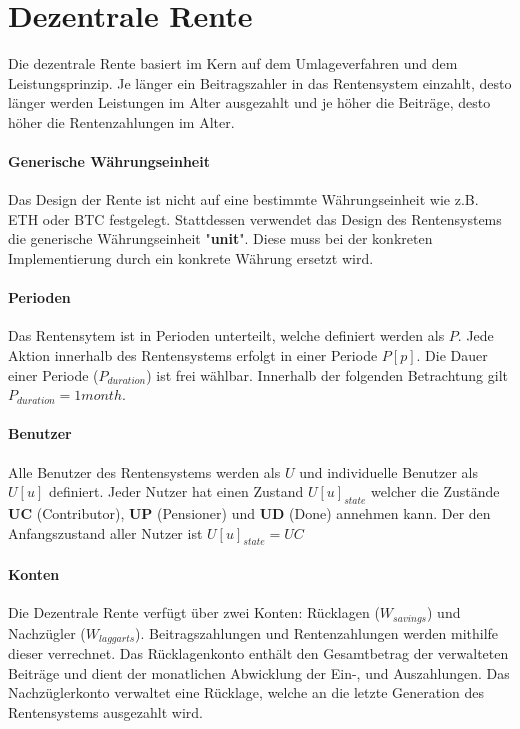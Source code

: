 \section{Dezentrale Rente}
Die dezentrale Rente basiert im Kern auf dem Umlageverfahren und dem
Leistungsprinzip. Je länger ein Beitragszahler in das Rentensystem einzahlt, 
desto länger werden Leistungen im Alter ausgezahlt und je höher die Beiträge,
desto höher die Rentenzahlungen im Alter.

\paragraph{Generische Währungseinheit} Das Design der Rente ist nicht auf eine bestimmte 
Währungseinheit wie z.B. ETH oder BTC festgelegt. Stattdessen verwendet das Design des
Rentensystems die generische Währungseinheit "\textbf{unit}". Diese muss bei der konkreten
Implementierung durch ein konkrete Währung ersetzt wird.

\paragraph{Perioden} Das Rentensytem ist in Perioden unterteilt, welche definiert werden als $P$. Jede Aktion innerhalb des Rentensystems erfolgt
in einer Periode $P[p]$. Die Dauer einer Periode ($P_{duration}$) ist frei wählbar. Innerhalb der folgenden Betrachtung gilt $P_{duration} = 1 month$.

\paragraph{Benutzer} Alle Benutzer des Rentensystems werden als $U$ und individuelle Benutzer als $U[u]$ definiert. Jeder Nutzer hat einen Zustand $U[u]_{state}$ welcher die Zustände \textbf{UC} (Contributor),
\textbf{UP} (Pensioner) und \textbf{UD} (Done) annehmen kann.
Der den Anfangszustand aller Nutzer ist $U[u]_{state} = UC$ 

\paragraph{Konten} Die Dezentrale Rente verfügt über zwei Konten: Rücklagen ($W_{savings}$) und Nachzügler ($W_{laggarts}$). Beitragszahlungen und Rentenzahlungen werden mithilfe dieser verrechnet. Das Rücklagenkonto enthält den Gesamtbetrag der verwalteten Beiträge und dient der monatlichen Abwicklung der Ein-, und Auszahlungen. Das Nachzüglerkonto  
verwaltet eine Rücklage, welche an die letzte Generation des Rentensystems ausgezahlt wird.


